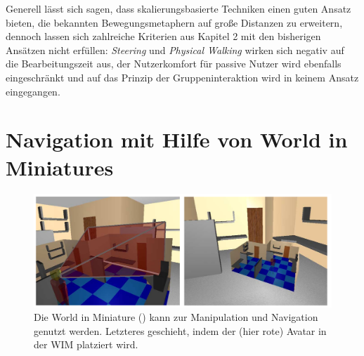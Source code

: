 Generell lässt sich sagen, dass skalierungsbasierte Techniken einen guten Ansatz bieten, die bekannten Bewegungsmetaphern auf große Distanzen zu erweitern, dennoch lassen sich zahlreiche Kriterien aus Kapitel 2 mit den bisherigen Ansätzen nicht erfüllen:
\textit{Steering} und \textit{Physical Walking} wirken sich negativ auf die Bearbeitungszeit aus, der Nutzerkomfort für passive Nutzer wird ebenfalls eingeschränkt und auf das Prinzip der Gruppeninteraktion wird in keinem Ansatz eingegangen.

\section{Navigation mit Hilfe von World in Miniatures}

\begin{figure}[h]
  \centering
  \includegraphics[width=\textwidth]{images/wim1.png}
  \caption{Die World in Miniature (\cite{Stoakley2010VirtualWIM}) kann zur Manipulation und Navigation genutzt werden. Letzteres geschieht, indem der (hier rote) Avatar in der WIM platziert wird.}
  \label{fig:todo}
\end{figure}

